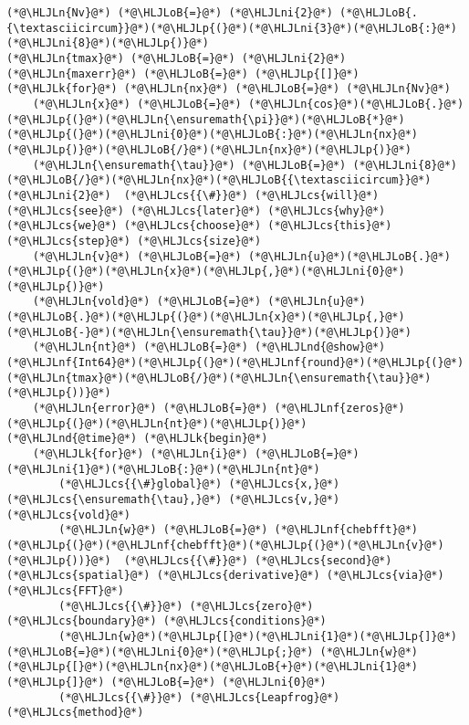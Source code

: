 \documentclass[12pt,a4paper]{article}
\newcommand{\HLJLk}[1]{\textcolor[RGB]{148,91,176}{\textbf{#1}}}
\newcommand{\HLJLn}[1]{#1}
\newcommand{\HLJLnd}[1]{\textcolor[RGB]{214,102,97}{#1}}
\newcommand{\HLJLnf}[1]{\textcolor[RGB]{66,102,213}{#1}}
\newcommand{\HLJLni}[1]{\textcolor[RGB]{59,151,46}{#1}}
\newcommand{\HLJLoB}[1]{\textcolor[RGB]{102,102,102}{\textbf{#1}}}
\newcommand{\HLJLp}[1]{#1}
\newcommand{\HLJLcs}[1]{\textcolor[RGB]{153,153,119}{\textit{#1}}}
\begin{document}
\begin{lstlisting}
(*@\HLJLn{Nv}@*) (*@\HLJLoB{=}@*) (*@\HLJLni{2}@*) (*@\HLJLoB{.{\textasciicircum}}@*)(*@\HLJLp{(}@*)(*@\HLJLni{3}@*)(*@\HLJLoB{:}@*)(*@\HLJLni{8}@*)(*@\HLJLp{)}@*)
(*@\HLJLn{tmax}@*) (*@\HLJLoB{=}@*) (*@\HLJLni{2}@*) 
(*@\HLJLn{maxerr}@*) (*@\HLJLoB{=}@*) (*@\HLJLp{[]}@*)
(*@\HLJLk{for}@*) (*@\HLJLn{nx}@*) (*@\HLJLoB{=}@*) (*@\HLJLn{Nv}@*)
    (*@\HLJLn{x}@*) (*@\HLJLoB{=}@*) (*@\HLJLn{cos}@*)(*@\HLJLoB{.}@*)(*@\HLJLp{(}@*)(*@\HLJLn{\ensuremath{\pi}}@*)(*@\HLJLoB{*}@*)(*@\HLJLp{(}@*)(*@\HLJLni{0}@*)(*@\HLJLoB{:}@*)(*@\HLJLn{nx}@*)(*@\HLJLp{)}@*)(*@\HLJLoB{/}@*)(*@\HLJLn{nx}@*)(*@\HLJLp{)}@*)
    (*@\HLJLn{\ensuremath{\tau}}@*) (*@\HLJLoB{=}@*) (*@\HLJLni{8}@*)(*@\HLJLoB{/}@*)(*@\HLJLn{nx}@*)(*@\HLJLoB{{\textasciicircum}}@*)(*@\HLJLni{2}@*)  (*@\HLJLcs{{\#}}@*) (*@\HLJLcs{will}@*) (*@\HLJLcs{see}@*) (*@\HLJLcs{later}@*) (*@\HLJLcs{why}@*) (*@\HLJLcs{we}@*) (*@\HLJLcs{choose}@*) (*@\HLJLcs{this}@*) (*@\HLJLcs{step}@*) (*@\HLJLcs{size}@*)
    (*@\HLJLn{v}@*) (*@\HLJLoB{=}@*) (*@\HLJLn{u}@*)(*@\HLJLoB{.}@*)(*@\HLJLp{(}@*)(*@\HLJLn{x}@*)(*@\HLJLp{,}@*)(*@\HLJLni{0}@*)(*@\HLJLp{)}@*) 
    (*@\HLJLn{vold}@*) (*@\HLJLoB{=}@*) (*@\HLJLn{u}@*)(*@\HLJLoB{.}@*)(*@\HLJLp{(}@*)(*@\HLJLn{x}@*)(*@\HLJLp{,}@*)(*@\HLJLoB{-}@*)(*@\HLJLn{\ensuremath{\tau}}@*)(*@\HLJLp{)}@*)
    (*@\HLJLn{nt}@*) (*@\HLJLoB{=}@*) (*@\HLJLnd{@show}@*) (*@\HLJLnf{Int64}@*)(*@\HLJLp{(}@*)(*@\HLJLnf{round}@*)(*@\HLJLp{(}@*)(*@\HLJLn{tmax}@*)(*@\HLJLoB{/}@*)(*@\HLJLn{\ensuremath{\tau}}@*)(*@\HLJLp{))}@*)
    (*@\HLJLn{error}@*) (*@\HLJLoB{=}@*) (*@\HLJLnf{zeros}@*)(*@\HLJLp{(}@*)(*@\HLJLn{nt}@*)(*@\HLJLp{)}@*)
(*@\HLJLnd{@time}@*) (*@\HLJLk{begin}@*)
    (*@\HLJLk{for}@*) (*@\HLJLn{i}@*) (*@\HLJLoB{=}@*) (*@\HLJLni{1}@*)(*@\HLJLoB{:}@*)(*@\HLJLn{nt}@*)
        (*@\HLJLcs{{\#}global}@*) (*@\HLJLcs{x,}@*) (*@\HLJLcs{\ensuremath{\tau},}@*) (*@\HLJLcs{v,}@*) (*@\HLJLcs{vold}@*)
        (*@\HLJLn{w}@*) (*@\HLJLoB{=}@*) (*@\HLJLnf{chebfft}@*)(*@\HLJLp{(}@*)(*@\HLJLnf{chebfft}@*)(*@\HLJLp{(}@*)(*@\HLJLn{v}@*)(*@\HLJLp{))}@*)  (*@\HLJLcs{{\#}}@*) (*@\HLJLcs{second}@*) (*@\HLJLcs{spatial}@*) (*@\HLJLcs{derivative}@*) (*@\HLJLcs{via}@*) (*@\HLJLcs{FFT}@*)
        (*@\HLJLcs{{\#}}@*) (*@\HLJLcs{zero}@*) (*@\HLJLcs{boundary}@*) (*@\HLJLcs{conditions}@*)
        (*@\HLJLn{w}@*)(*@\HLJLp{[}@*)(*@\HLJLni{1}@*)(*@\HLJLp{]}@*)(*@\HLJLoB{=}@*)(*@\HLJLni{0}@*)(*@\HLJLp{;}@*) (*@\HLJLn{w}@*)(*@\HLJLp{[}@*)(*@\HLJLn{nx}@*)(*@\HLJLoB{+}@*)(*@\HLJLni{1}@*)(*@\HLJLp{]}@*) (*@\HLJLoB{=}@*) (*@\HLJLni{0}@*)
        (*@\HLJLcs{{\#}}@*) (*@\HLJLcs{Leapfrog}@*) (*@\HLJLcs{method}@*)

\end{lstlisting}
\end{document}
